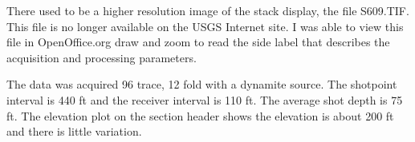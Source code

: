 \begin{comment}
This will untar the directory.  When it completes, continue:\\
cd open\_lib\_demo\_2011\\
cat readme

This will tell you about the files you downloaded.  You can look at the 
su commands the process will use by typing:\\
cat doit.job

Then you can run the processing by typing:\\  
./doit.job

You can also run the individual tasks with the scripts in the tar file. 
For example, to view the previous final stack, the text says run:
\begin{verbatim}
scons prevstack.view 
\end{verbatim}
You can run the script from the tar file:
\begin{verbatim}
./prevstack.job
\end{verbatim}

The scons will download the file \texttt{31\_81\_IM.JPG} from the Internet and 
display it using open office draw (oodraw).  The tar file supplies the 
files so the scripts skip the download.  ./prevstack.job just displays
the file using oodraw.
\end{comment}

There used to be a higher resolution image of the stack display, the 
file S609.TIF.  This file is no longer available on the USGS Internet 
site.  I was able to view this file in OpenOffice.org draw 
and zoom to read the side label that describes the acquisition and 
processing parameters.

The data was acquired 96 trace, 12 fold with a dynamite source.  The
shotpoint interval is 440 ft and the receiver interval is 110 ft.  The
average shot depth is 75 ft.  The elevation plot on the section header
shows the elevation is about 200 ft and there is little variation.


